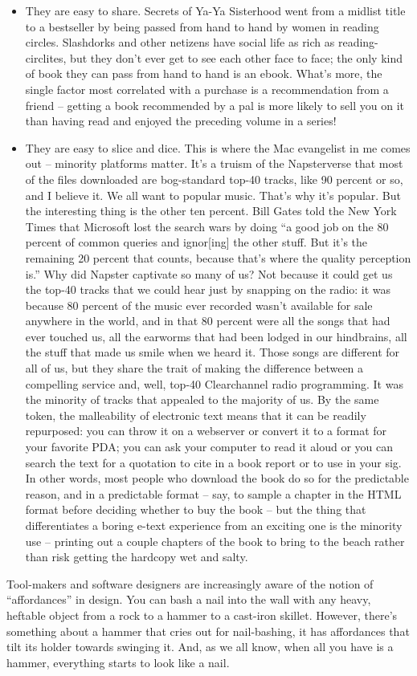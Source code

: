 \begin{itemize}
\item
  They are easy to share. Secrets of Ya-Ya Sisterhood went from a
  midlist title to a bestseller by being passed from hand to hand by
  women in reading circles. Slashdorks and other netizens have social
  life as rich as reading-circlites, but they don't ever get to see
  each other face to face; the only kind of book they can pass from
  hand to hand is an ebook. What's more, the single factor most
  correlated with a purchase is a recommendation from a friend --
  getting a book recommended by a pal is more likely to sell you on
  it than having read and enjoyed the preceding volume in a series!
\item
  They are easy to slice and dice. This is where the Mac evangelist
  in me comes out -- minority platforms matter. It's a truism of the
  Napsterverse that most of the files downloaded are bog-standard
  top-40 tracks, like 90 percent or so, and I believe it. We all want
  to popular music. That's why it's popular. But the interesting
  thing is the other ten percent. Bill Gates told the New York Times
  that Microsoft lost the search wars by doing ``a good job on the 80
  percent of common queries and ignor[ing] the other stuff. But it's
  the remaining 20 percent that counts, because that's where the
  quality perception is.'' Why did Napster captivate so many of us?
  Not because it could get us the top-40 tracks that we could hear
  just by snapping on the radio: it was because 80 percent of the
  music ever recorded wasn't available for sale anywhere in the
  world, and in that 80 percent were all the songs that had ever
  touched us, all the earworms that had been lodged in our
  hindbrains, all the stuff that made us smile when we heard it.
  Those songs are different for all of us, but they share the trait
  of making the difference between a compelling service and, well,
  top-40 Clearchannel radio programming. It was the minority of
  tracks that appealed to the majority of us. By the same token, the
  malleability of electronic text means that it can be readily
  repurposed: you can throw it on a webserver or convert it to a
  format for your favorite PDA; you can ask your computer to read it
  aloud or you can search the text for a quotation to cite in a book
  report or to use in your sig. In other words, most people who
  download the book do so for the predictable reason, and in a
  predictable format -- say, to sample a chapter in the HTML format
  before deciding whether to buy the book -- but the thing that
  differentiates a boring e-text experience from an exciting one is
  the minority use -- printing out a couple chapters of the book to
  bring to the beach rather than risk getting the hardcopy wet and
  salty.
\end{itemize}
Tool-makers and software designers are increasingly aware of the
notion of ``affordances'' in design. You can bash a nail into the
wall with any heavy, heftable object from a rock to a hammer to a
cast-iron skillet. However, there's something about a hammer that
cries out for nail-bashing, it has affordances that tilt its holder
towards swinging it. And, as we all know, when all you have is a
hammer, everything starts to look like a nail.

